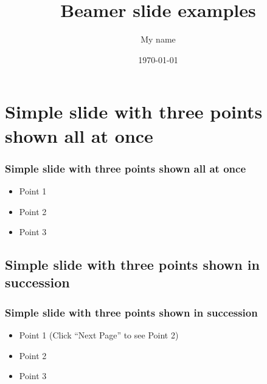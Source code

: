 \documentclass[aspectratio=169]{beamer}
\title{Beamer slide examples}    %
\author{My name}                 %
\institute{My organization}      %
\date{\today}
\begin{document}
\begin{frame}
  \titlepage
\end{frame}

\section[Outline] {}

\begin{frame}
  \tableofcontents
\end{frame}


\section{Simple slide with three points shown all at once}

\begin{frame}
  \frametitle{Simple slide with three points shown all at once}   %

  \begin{itemize}
  \item Point 1
  \item Point 2
  \item Point 3
  \end{itemize}
\end{frame}

\subsection{Simple slide with three points shown in succession}

\begin{frame}
  \frametitle{Simple slide with three points shown in succession}   %

  \begin{itemize}
  \item<1-> Point 1 (Click ``Next Page'' to see Point 2) %
  \item<2-> Point 2  %
  \item<3-> Point 3
  \end{itemize}
\end{frame}
\end{document}
